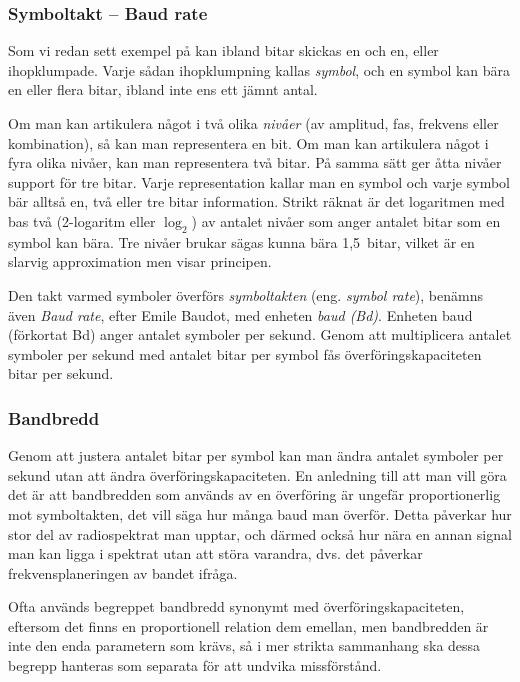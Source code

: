 \subsubsection{Symboltakt -- Baud rate}

Som vi redan sett exempel på kan ibland bitar skickas en och en, eller
ihopklumpade. Varje sådan ihopklumpning kallas \emph{symbol}, och en symbol
kan bära en eller flera bitar, ibland inte ens ett jämnt antal.

Om man kan artikulera något i två olika \emph{nivåer} (av amplitud, fas, frekvens
eller kombination), så kan man representera en bit. Om man kan artikulera något
i fyra olika nivåer, kan man representera två bitar. På samma sätt ger åtta nivåer
support för tre bitar. Varje representation kallar man en symbol och varje
symbol bär alltså en, två eller tre bitar information. Strikt räknat
är det logaritmen med bas två (2-logaritm eller $\log_{2}$) av antalet nivåer som
anger antalet bitar som en symbol kan bära.
Tre nivåer brukar sägas kunna bära 1,5~bitar, vilket är en slarvig approximation
men visar principen.

Den takt varmed symboler överförs \emph{symboltakten} (eng. \emph{symbol rate}),
benämns även \emph{Baud rate}, efter Emile Baudot, med enheten \emph{baud (Bd)}.
Enheten baud (förkortat Bd) anger antalet symboler per sekund. Genom att
multiplicera antalet symboler per sekund med antalet bitar per symbol fås
överföringskapaciteten bitar per sekund.

\subsubsection{Bandbredd}

Genom att justera antalet bitar per symbol kan man ändra antalet symboler
per sekund utan att ändra överföringskapaciteten. En anledning till att man
vill göra det är att bandbredden som används av en överföring är ungefär
proportionerlig mot symboltakten, det vill säga hur många baud man överför.
Detta påverkar hur stor del av radiospektrat man upptar, och därmed också hur
nära en annan signal man kan ligga i spektrat utan att störa varandra, dvs.
det påverkar frekvensplaneringen av bandet ifråga.

Ofta används begreppet bandbredd synonymt med överföringskapaciteten, eftersom
det finns en proportionell relation dem emellan, men bandbredden är inte den
enda parametern som krävs, så i mer strikta sammanhang ska dessa begrepp
hanteras som separata för att undvika missförstånd.

